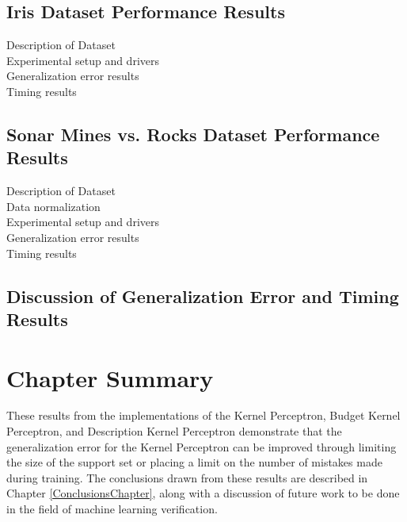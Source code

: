 \subsection{Iris Dataset Performance Results}\label{IrisResults}
Description of Dataset
\\Experimental setup and drivers
\\Generalization error results
\\Timing results
\subsection{Sonar Mines vs. Rocks Dataset Performance Results}\label{SonarResults}
Description of Dataset
\\Data normalization
\\Experimental setup and drivers
\\Generalization error results
\\Timing results
\subsection{Discussion of Generalization Error and Timing Results}\label{ResultsDiscussion}
\section{Chapter Summary}\label{ResultsChapterSummarySection}
These results from the implementations of the Kernel Perceptron, Budget Kernel Perceptron, and Description Kernel Perceptron demonstrate that the generalization error for the Kernel Perceptron can be improved through limiting the size of the support set or placing a limit on the number of mistakes made during training. The conclusions drawn from these results are described in Chapter \ref{ConclusionsChapter}, along with a discussion of future work to be done in the field of machine learning verification.
